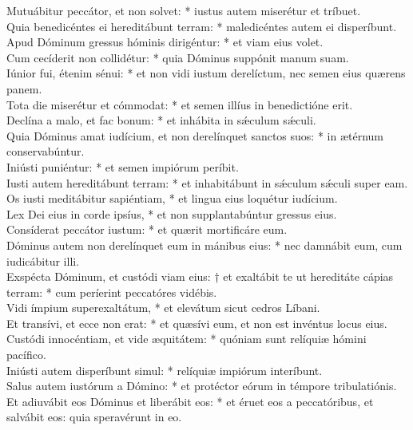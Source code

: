 {	Mutuábitur peccátor, et non solvet: * iustus autem miserétur et tríbuet. \\
	Quia benedicéntes ei hereditábunt terram: * maledicéntes autem ei disperíbunt. \\
	Apud Dóminum gressus hóminis dirigéntur: * et viam eius volet. \\
	Cum cecíderit non collidétur: * quia Dóminus suppónit manum suam. \\
	Iúnior fui, étenim sénui: * et non vidi iustum derelíctum, nec semen eius quærens panem. \\
	Tota die miserétur et cómmodat: * et semen illíus in benedictióne erit. \\
	Declína a malo, et fac bonum: * et inhábita in sǽculum sǽculi. \\
	Quia Dóminus amat iudícium, et non derelínquet sanctos suos: * in ætérnum conservabúntur. \\
	Iniústi puniéntur: * et semen impiórum períbit. \\
	Iusti autem hereditábunt terram: * et inhabitábunt in sǽculum sǽculi super eam. \\
	Os iusti meditábitur sapiéntiam, * et lingua eius loquétur iudícium. \\
	Lex Dei eius in corde ipsíus, * et non supplantabúntur gressus eius. \\
	Consíderat peccátor iustum: * et quærit mortificáre eum. \\
	Dóminus autem non derelínquet eum in mánibus eius: * nec damnábit eum, cum iudicábitur illi. \\
	Exspécta Dóminum, et custódi viam eius: † et exaltábit te ut hereditáte cápias terram: * cum períerint peccatóres vidébis. \\
	Vidi ímpium superexaltátum, * et elevátum sicut cedros Líbani. \\
	Et transívi, et ecce non erat: * et quæsívi eum, et non est invéntus locus eius. \\
	Custódi innocéntiam, et vide æquitátem: * quóniam sunt relíquiæ hómini pacífico. \\
	Iniústi autem disperíbunt simul: * relíquiæ impiórum interíbunt. \\
	Salus autem iustórum a Dómino: * et protéctor eórum in témpore tribulatiónis. \\
	Et adiuvábit eos Dóminus et liberábit eos: * et éruet eos a peccatóribus, et salvábit eos: quia speravérunt in eo. \\
}

